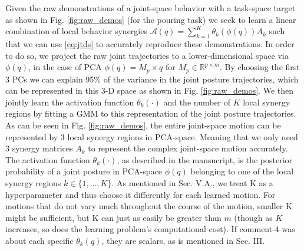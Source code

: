 \documentclass{article}
\begin{document}
\begin{enumerate}
Given the raw demonstrations of a joint-space  behavior with a task-space target as shown in Fig. \ref{fig:raw_demos} (for the pouring task) we seek to learn a linear combination of local behavior synergies $\mathcal{A}(q) = \sum\limits_{k=1}^{K}\theta_k(\phi(q))A_k$ such that we can use \eqref{eq:jtds} to accurately reproduce these demonstrations. In order to do so, we project the raw joint trajectories to a lower-dimensional space via $\phi(q)$, in the case of PCA $\phi(q)=M_p \times q$ for $M_p \in \mathbb{R}^{p \times m}$. By choosing the first 3 PCs we can explain 95\% of the variance in the joint posture trajectories, which can be represented in this 3-D space as shown in Fig. \ref{fig:raw_demos}. We then jointly learn the activation function $\theta_k(\cdot)$ and the number of $K$ local synergy regions by fitting a GMM to this representation of the joint posture trajectories. As can be seen in Fig. \ref{fig:raw_demos}, the entire joint-space motion can be represented by 3 local synergy regions in PCA-space. Meaning that we only need 3 synergy matrices $A_k$ to represent the complex joint-space motion accurately. The activation function $\theta_k(\cdot)$, as described in the mansucript, is the posterior probability of a joint posture in PCA-space $\phi(q)$ belonging to one of the local synergy regions $k \in \{1,\dots,K\}$. As mentioned in Sec. V.A., we treat K as a hyperparameter and thus choose it differently for each learned motion. For motions that do not vary much throughout the course of the motion, smaller K might be sufficient, but K can just as easily be greater than $m$ (though as $K$ increases, so does the learning problem's computational cost). If comment-4 was about each specific $\theta_k(q)$, they are scalars, as is mentioned in Sec. III.



\end{enumerate}
\end{document}
